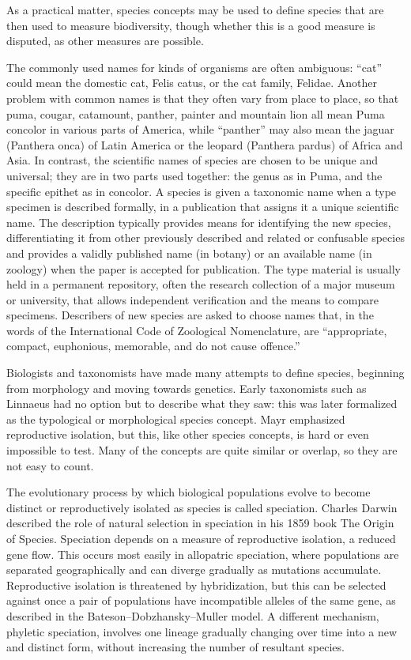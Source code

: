 \documentclass[]{book}
\theoremstyle{definition}
\theoremstyle{definition}
\theoremstyle{definition}
\theoremstyle{remark}
\begin{document}
\begin{enumerate}
As a practical matter, species concepts may be used to define species
that are then used to measure biodiversity, though whether this is a
good measure is disputed, as other measures are possible.

The commonly used names for kinds of organisms are often ambiguous:
``cat'' could mean the domestic cat, Felis catus, or the cat family,
Felidae. Another problem with common names is that they often vary from
place to place, so that puma, cougar, catamount, panther, painter and
mountain lion all mean Puma concolor in various parts of America, while
``panther'' may also mean the jaguar (Panthera onca) of Latin America or
the leopard (Panthera pardus) of Africa and Asia. In contrast, the
scientific names of species are chosen to be unique and universal; they
are in two parts used together: the genus as in Puma, and the specific
epithet as in concolor. A species is given a taxonomic name when a type
specimen is described formally, in a publication that assigns it a
unique scientific name. The description typically provides means for
identifying the new species, differentiating it from other previously
described and related or confusable species and provides a validly
published name (in botany) or an available name (in zoology) when the
paper is accepted for publication. The type material is usually held in
a permanent repository, often the research collection of a major museum
or university, that allows independent verification and the means to
compare specimens. Describers of new species are asked to choose names
that, in the words of the International Code of Zoological Nomenclature,
are ``appropriate, compact, euphonious, memorable, and do not cause
offence.''

Biologists and taxonomists have made many attempts to define species,
beginning from morphology and moving towards genetics. Early taxonomists
such as Linnaeus had no option but to describe what they saw: this was
later formalized as the typological or morphological species concept.
Mayr emphasized reproductive isolation, but this, like other species
concepts, is hard or even impossible to test. Many of the concepts are
quite similar or overlap, so they are not easy to count.

The evolutionary process by which biological populations evolve to
become distinct or reproductively isolated as species is called
speciation. Charles Darwin described the role of natural selection in
speciation in his 1859 book The Origin of Species. Speciation depends on
a measure of reproductive isolation, a reduced gene flow. This occurs
most easily in allopatric speciation, where populations are separated
geographically and can diverge gradually as mutations accumulate.
Reproductive isolation is threatened by hybridization, but this can be
selected against once a pair of populations have incompatible alleles of
the same gene, as described in the Bateson--Dobzhansky--Muller model. A
different mechanism, phyletic speciation, involves one lineage gradually
changing over time into a new and distinct form, without increasing the
number of resultant species.


\end{enumerate}
\end{document}
